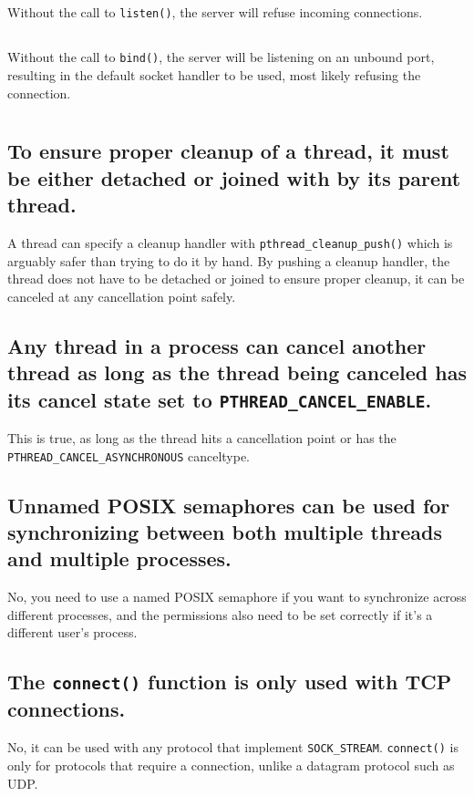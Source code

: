 \documentclass[a4paper,11pt]{article}
\def\code#1{\texttt{#1}}
\begin{document}
\subsection{}
Without the call to \code{listen()}, the server will refuse incoming connections.

\subsection{}
Without the call to \code{bind()}, the server will be listening on an unbound port,
resulting in the default socket handler to be used, most likely refusing the connection.

\section{}
\subsection{To ensure proper cleanup of a thread, it must be either detached or joined with by its
parent thread.}
A thread can specify a cleanup handler with \code{pthread\_cleanup\_push()} which is arguably
safer than trying to do it by hand.
By pushing a cleanup handler, the thread does not have to be detached or joined to ensure
proper cleanup, it can be canceled at any cancellation point safely.

\subsection{Any thread in a process can cancel another thread as long as the thread being canceled
has its cancel state set to \code{PTHREAD\_CANCEL\_ENABLE}.}
This is true, as long as the thread hits a cancellation point or has the
\code{PTHREAD\_CANCEL\_ASYNCHRONOUS} canceltype.

\subsection{Unnamed POSIX semaphores can be used for synchronizing between both multiple
threads and multiple processes.}
No, you need to use a named POSIX semaphore if you want to synchronize across different
processes, and the permissions also need to be set correctly if it's a different
user's process.

\subsection{The \code{connect()} function is only used with TCP connections.}
No, it can be used with any protocol that implement \code{SOCK\_STREAM}.
\code{connect()} is only for protocols that require a connection, unlike a datagram
protocol such as UDP.
\end{document}
